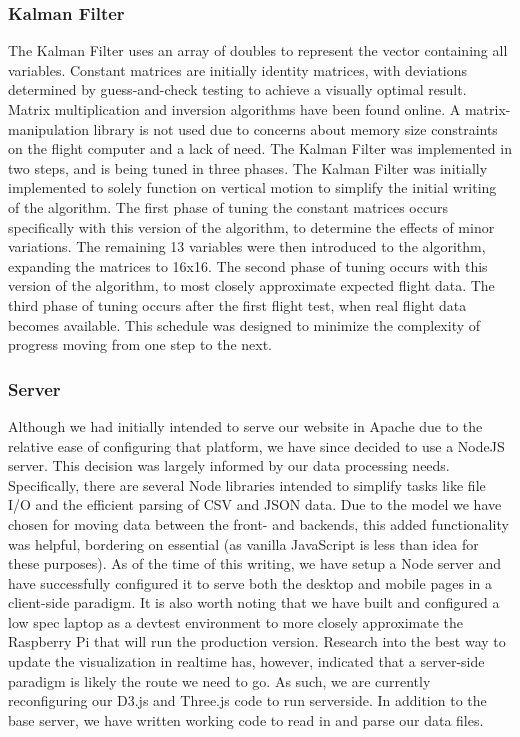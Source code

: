 \documentclass[journal,10pt,onecolumn,compsoc]{IEEEtran}
\begin{document}
		\subsubsection{Kalman Filter}
			The Kalman Filter uses an array of doubles to represent the vector containing all variables.
			Constant matrices are initially identity matrices, with deviations determined by guess-and-check testing to achieve a visually optimal result.
			Matrix multiplication and inversion algorithms have been found online.
			A matrix-manipulation library is not used due to concerns about memory size constraints on the flight computer and a lack of need.
			The Kalman Filter was implemented in two steps, and is being tuned in three phases.
			The Kalman Filter was initially implemented to solely function on vertical motion to simplify the initial writing of the algorithm.
			The first phase of tuning the constant matrices occurs specifically with this version of the algorithm, to determine the effects of minor variations.
			The remaining 13 variables were then introduced to the algorithm, expanding the matrices to 16x16.
			The second phase of tuning occurs with this version of the algorithm, to most closely approximate expected flight data.
			The third phase of tuning occurs after the first flight test, when real flight data becomes available.
			This schedule was designed to minimize the complexity of progress moving from one step to the next.
			
		\subsubsection{Server}
      Although we had initially intended to serve our website in Apache due to the relative ease of configuring that platform, we have since decided to use a NodeJS server.
      This decision was largely informed by our data processing needs.
      Specifically, there are several Node libraries intended to simplify tasks like file I/O and the efficient parsing of CSV and JSON data.
      Due to the model we have chosen for moving data between the front- and backends, this added functionality was helpful, bordering on essential (as vanilla JavaScript is less than idea for these purposes).
			As of the time of this writing, we have setup a Node server and have successfully configured it to serve both the desktop and mobile pages in a client-side paradigm.
      It is also worth noting that we have built and configured a low spec laptop as a devtest environment to more closely approximate the Raspberry Pi that will run the production version.
      Research into the best way to update the visualization in realtime has, however, indicated that a server-side paradigm is likely the route we need to go.
      As such, we are currently reconfiguring our D3.js and Three.js code to run serverside.
      In addition to the base server, we have written working code to read in and parse our data files.
	
\end{document}
